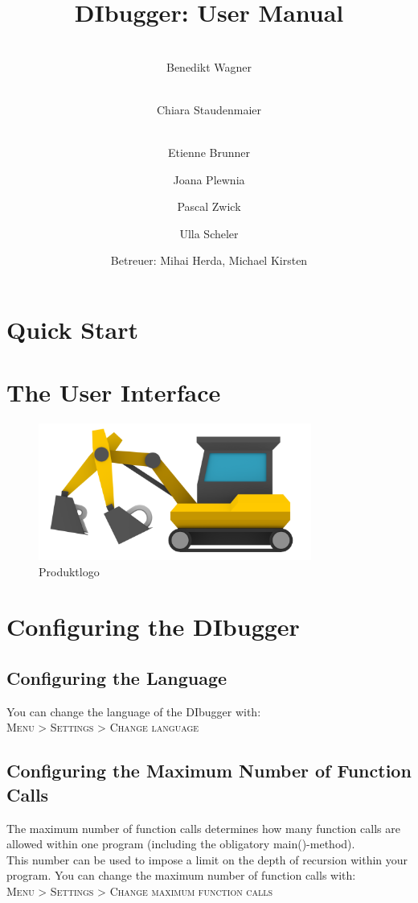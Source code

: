 \documentclass[parskip=full]{memoir}
\title{
	\vspace{2cm}
	\myfont 
	DIbugger: User Manual\\
}
\author{
	\vspace{1cm} \\
	Benedikt Wagner\\
	\and
	\vspace{1cm} \\ Chiara Staudenmaier\\
	\and 
		\vspace{1cm} \\
		Etienne Brunner\\
	\and Joana Plewnia\\
	\and Pascal Zwick\\
	\and Ulla Scheler\\
	\vspace{1cm}
	\and Betreuer: Mihai Herda, Michael Kirsten
	\vspace{4cm}
}
\begin{document}
\clearpage
\maketitle
{}
\newpage

\tableofcontents
\newpage
{}

\chapter{Quick Start} %
\chapter{The User Interface} %

\begin{figure}[!h]
\centering
\includegraphics[width=0.8\textwidth]{../Plichtenheft/logo_nongi.png}
\caption{Produktlogo}
\end{figure}


\chapter{Configuring the DIbugger} %
\section{Configuring the Language}
You can change the language of the DIbugger with:\\
\textsc{Menu > Settings > Change language}

\section{Configuring the Maximum Number of Function Calls}
The maximum number of function calls determines how many function calls are allowed within one program (including the obligatory main()-method). \\
This number can be used to impose a limit on the depth of recursion within your program.
You can change the maximum number of function calls with:\\
\textsc{Menu > Settings > Change maximum function calls}
\end{document}
